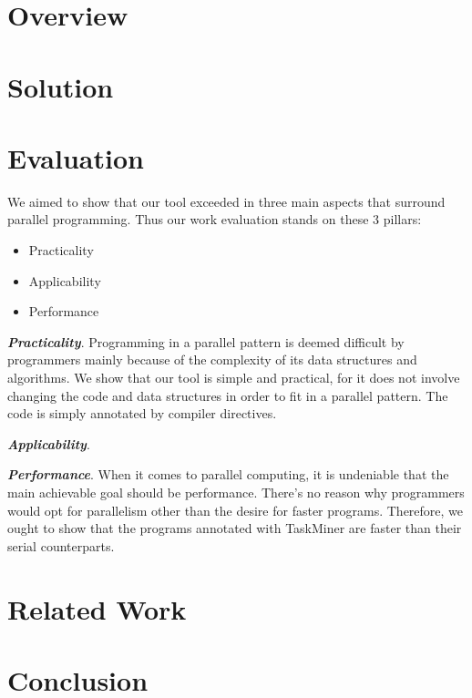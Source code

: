\documentclass[sigplan,10pt,review,anonymous]{acmart}
\begin{document}
\section{Overview}
\label{sec:ovf}






\section{Solution}
\label{sec:sol}

\section{Evaluation}
\label{sec:eval}

We aimed to show that our tool exceeded in three main aspects that surround parallel programming. Thus our work evaluation stands on these 3 pillars:

\begin{itemize}

\item Practicality
\item Applicability
\item Performance

\end{itemize}

\textbf{\textit{Practicality}}. Programming in a parallel pattern is deemed difficult by programmers mainly because of the complexity of its data structures and algorithms. We show that our tool is simple and practical, for it does not involve changing the code and data structures in order to fit in a parallel pattern. The code is simply annotated by compiler directives.

\textbf{\textit{Applicability}}. 

\textbf{\textit{Performance}}. When it comes to parallel computing, it is undeniable that the main achievable goal should be performance. There's no reason why programmers would opt for parallelism other than the desire for faster programs. Therefore, we ought to show that the programs annotated with TaskMiner are faster than their serial counterparts. 

\section{Related Work}
\label{sec:rw}

\section{Conclusion}
\label{sec:conc}


\end{document}
